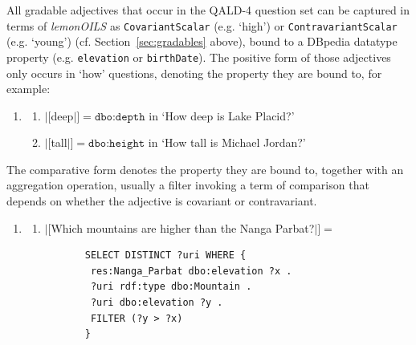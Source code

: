 \documentclass[11pt]{article}
\begin{document}
All gradable adjectives that occur in the QALD-4 question set can be captured in terms of \emph{lemonOILS} 
as \texttt{CovariantScalar} (e.g. `high') or \texttt{ContravariantScalar} (e.g. `young') (cf. Section~\ref{sec:gradables} above), 
bound to a DBpedia datatype property (e.g. \texttt{elevation} or \texttt{birthDate}). 
The positive form of those adjectives only occurs in `how' questions, denoting the property they are bound to, for example:
\begin{enumerate} 
\item \begin{enumerate}
 \item $|[$deep$|]=\texttt{dbo:depth}$ in `How deep is Lake Placid?'
 \item $|[$tall$|]=\texttt{dbo:height}$ in `How tall is Michael Jordan?'
 \end{enumerate}
\end{enumerate}
The comparative form denotes the property they are bound to, together with an aggregation operation, usually a filter 
invoking a term of comparison that depends on whether the adjective is covariant or contravariant.
\begin{enumerate}[resume]
\item \begin{enumerate}
 \item $|[$Which mountains are higher than the Nanga Parbat?$|]=$
       \begin{small}\begin{verbatim}
       SELECT DISTINCT ?uri WHERE { 
        res:Nanga_Parbat dbo:elevation ?x .
        ?uri rdf:type dbo:Mountain .
        ?uri dbo:elevation ?y . 
        FILTER (?y > ?x) 
       }
       \end{verbatim}\end{small} 
\end{enumerate}
\end{enumerate}
\end{document}
